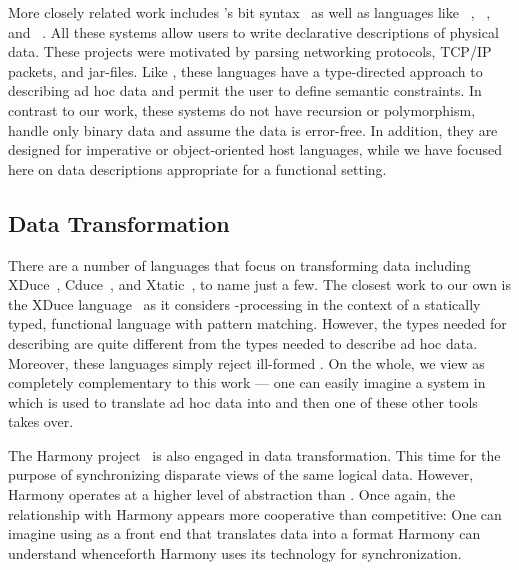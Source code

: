 More closely related work includes \erlang{}'s bit
syntax~\cite{erlang} as well as languages like \packettypes~\cite{sigcomm00},
\datascript~\cite{gpce02}, and \blt~\cite{eger:blt}. 
All these systems allow users to write declarative
descriptions of physical data.  These projects were motivated by
parsing networking protocols, \textsc{TCP/IP} packets, and \java{} 
jar-files.  Like \datatype, these languages have a type-directed
approach to describing ad hoc data and permit the user to define
semantic constraints.  In contrast to our work, these systems 
do not have recursion or polymorphism, handle
only binary data and assume the data is error-free.
In addition, they are designed for imperative or object-oriented host
languages, while we have focused here on data descriptions appropriate for a
functional setting.

\subsection{Data Transformation}
There are a number of languages that focus on transforming \xml{}
data including XDuce~\cite{hosoya+:xduce-journal}, 
Cduce~\cite{benzaken+:cduce}, and 
Xtatic~\cite{gapeyev+:XtaticRuntime}, to name just a few.
The closest work to our own is the XDuce
language~\cite{hosoya+:xduce-journal} as it considers
\xml-processing in the context of a
statically typed, functional language with pattern matching. 
However, the types needed for describing \xml{} are quite different
from the types needed to describe ad hoc data.  Moreover,
these languages simply reject ill-formed \xml.  On the whole,
we view \datatype{} as completely complementary to this work ---
one can easily imagine a system in which \datatype{} is used to translate
ad hoc data into \xml{} and then one of these other tools takes over.
 
The Harmony project~\cite{foster+:lenses} is also engaged in 
data transformation.  This time for the purpose of synchronizing
disparate views of the same logical data. 
However, Harmony operates at a higher 
level of abstraction than \datatype.  Once again, the relationship 
with Harmony appears more cooperative than competitive:  One can 
imagine using \datatype{} as a front end that translates data into 
a format Harmony can understand whenceforth Harmony uses
its technology for synchronization.  


